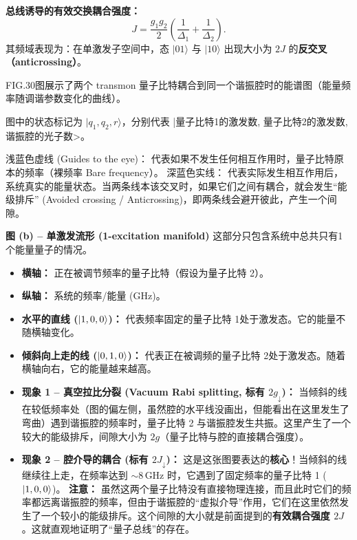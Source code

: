 \documentclass[12pt,a4paper,oneside]{ctexbook}
\begin{document}
\noindent\textbf{总线诱导的有效交换耦合强度：}
\begin{equation}
  J=\frac{g_1 g_2}{2}\left(\frac{1}{\Delta_1}+\frac{1}{\Delta_2}\right).
  \label{eq:Jbus}
\end{equation}
其频域表现为：在单激发子空间中，态 $|01\rangle$ 与 $|10\rangle$ 出现大小为 $2J$ 的\textbf{反交叉（anticrossing）}。



FIG.30图展示了两个 transmon 量子比特耦合到同一个谐振腔时的能谱图（能量频率随调谐参数变化的曲线）。

图中的状态标记为 $|q_1, q_2, r\rangle$，分别代表 |量子比特1的激发数, 量子比特2的激发数, 谐振腔的光子数>。

浅蓝色虚线 (Guides to the eye)： 代表如果不发生任何相互作用时，量子比特原本的频率（裸频率 Bare frequency）。
深蓝色实线： 代表实际发生相互作用后，系统真实的能量状态。当两条线本该交叉时，如果它们之间有耦合，就会发生“能级排斥” (Avoided crossing / Anticrossing)，即两条线会避开彼此，产生一个间隙。


\textbf{图 (b) -- 单激发流形 (1-excitation manifold)}
这部分只包含系统中总共只有1个能量量子的情况。

\begin{itemize}
    \item \textbf{横轴：} 正在被调节频率的量子比特（假设为量子比特 2）。
    \item \textbf{纵轴：} 系统的频率/能量 (GHz)。
    \item \textbf{水平的直线 ($\ket{1, 0, 0}$)：} 代表频率固定的量子比特 1处于激发态。它的能量不随横轴变化。
    \item \textbf{倾斜向上走的线 ($\ket{0, 1, 0}$)：} 代表正在被调频的量子比特 2处于激发态。随着横轴向右，它的能量越来越高。
    \item \textbf{现象 1 -- 真空拉比分裂 (Vacuum Rabi splitting, 标有 $2g_\downarrow$)：}
          当倾斜的线在较低频率处（图的偏左侧，虽然腔的水平线没画出，但能看出在这里发生了弯曲）遇到谐振腔的频率时，量子比特 2 与谐振腔发生共振。这里产生了一个较大的能级排斥，间隙大小为 \textbf{$2g$}（量子比特与腔的直接耦合强度）。
    \item \textbf{现象 2 -- 腔介导的耦合 (标有 $2J_\downarrow$)：}
          这是这张图要表达的\textbf{核心}！当倾斜的线继续往上走，在频率达到 \(\sim 8\,\text{GHz}\) 时，它遇到了固定频率的量子比特 1 ($\ket{1, 0, 0}$)。
          \textbf{注意：} 虽然这两个量子比特没有直接物理连接，而且此时它们的频率都远离谐振腔的频率，但由于谐振腔的“虚拟介导”作用，它们在这里依然发生了一个较小的能级排斥。这个间隙的大小就是前面提到的\textbf{有效耦合强度 $2J$}。这就直观地证明了“量子总线”的存在。
\end{itemize}
\end{document}
